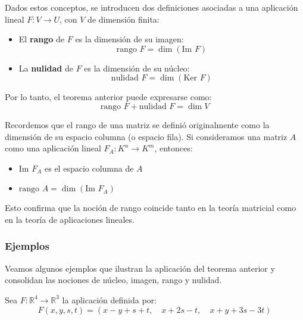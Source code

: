 Dados estos conceptos, se introducen dos definiciones asociadas a una aplicación lineal \(F: V \rightarrow U\), con \(V\) de dimensión finita:

\begin{itemize}
  \item El \textbf{rango} de \(F\) es la dimensión de su imagen:
    \[
      \text{rango } F = \dim(\text{Im } F)
    \]
  \item La \textbf{nulidad} de \(F\) es la dimensión de su núcleo:
    \[
      \text{nulidad } F = \dim(\text{Ker } F)
    \]
\end{itemize}

Por lo tanto, el teorema anterior puede expresarse como:
\[
  \text{rango } F + \text{nulidad } F = \dim V
\]

\vspace{5pt}

\begin{tcolorbox}[title=Relación con matrices]
  Recordemos que el rango de una matriz se definió originalmente como la dimensión de su espacio columna (o espacio fila). Si consideramos una matriz \(A\) como una aplicación lineal \(F_A: K^n \rightarrow K^m\), entonces:
  \begin{itemize}
    \item \(\text{Im } F_A\) es el espacio columna de \(A\)
    \item \(\text{rango } A = \dim(\text{Im } F_A)\)
  \end{itemize}
  Esto confirma que la noción de rango coincide tanto en la teoría matricial como en la teoría de aplicaciones lineales.
\end{tcolorbox}

\subsubsection{Ejemplos}

Veamos algunos ejemplos que ilustran la aplicación del teorema anterior y consolidan las nociones de núcleo, imagen, rango y nulidad.


Sea \(F:\mathbb{R}^4 \rightarrow \mathbb{R}^3\) la aplicación definida por:
\[
  F(x,y,s,t) = (x-y+s+t,\quad x+2s-t,\quad x+y+3s-3t)
\]

